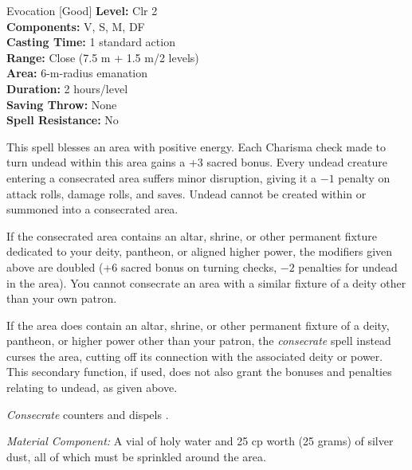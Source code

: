 {Evocation [Good]}
{
	\textbf{Level:}
	Clr 2\\
	\textbf{Components:}
	V, S, M, DF\\
	\textbf{Casting Time:}
	1 standard action\\
	\textbf{Range:}
	Close (7.5 m + 1.5 m/2 levels)\\
	\textbf{Area:}
	6-m-radius emanation\\
	\textbf{Duration:}
	2 hours/level\\
	\textbf{Saving Throw:}
	None\\
	\textbf{Spell Resistance:}
	No\\
}
{
	This spell blesses an area with positive energy. Each Charisma check made to turn undead within this area gains a +3 sacred bonus. Every undead creature entering a consecrated area suffers minor disruption, giving it a $-1$ penalty on attack rolls, damage rolls, and saves. Undead cannot be created within or summoned into a consecrated area.

	If the consecrated area contains an altar, shrine, or other permanent fixture dedicated to your deity, pantheon, or aligned higher power, the modifiers given above are doubled (+6 sacred bonus on turning checks, $-2$ penalties for undead in the area). You cannot consecrate an area with a similar fixture of a deity other than your own patron.

	If the area does contain an altar, shrine, or other permanent fixture of a deity, pantheon, or higher power other than your patron, the \emph{consecrate} spell instead curses the area, cutting off its connection with the associated deity or power. This secondary function, if used, does not also grant the bonuses and penalties relating to undead, as given above.

	\emph{Consecrate} counters and dispels .

	\textit{Material Component:}
	A vial of holy water and 25 cp worth (25 grams) of silver dust, all of which must be sprinkled around the area.

}
